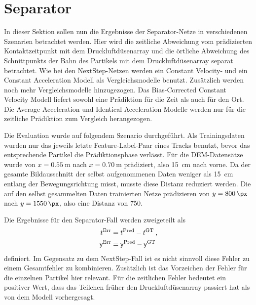 


\section{Separator}





In dieser Sektion sollen nun die Ergebnisse der Separator-Netze in verschiedenen Szenarien betrachtet werden.
Hier wird  die zeitliche Abweichung vom prädizierten Kontaktzeitpunkt mit dem Druckluftdüsenarray und die örtliche Abweichung des Schnittpunkts der Bahn des Partikels mit dem Druckluftdüsenarray separat betrachtet.
Wie bei den NextStep-Netzen werden ein Constant Velocity- und ein Constant Acceleration Modell 
als Vergleichsmodelle benutzt. 
Zusätzlich werden noch mehr Vergleichsmodelle hinzugezogen. 
Das Bias-Corrected Constant Velocity Modell liefert sowohl eine Prädiktion für die Zeit als auch für den Ort.
Die Average Acceleration und Identical Acceleration Modelle werden nur für die zeitliche Prädiktion zum Vergleich herangezogen.

Die Evaluation wurde auf folgendem Szenario durchgeführt.
Als Trainingsdaten wurden nur das jeweils letzte Feature-Label-Paar eines Tracks benutzt, bevor das entsprechende Partikel die Prädiktionsphase verlässt.
Für die DEM-Datensätze wurde von \(x = \SI{0.55}{\meter}\) nach \(x = \SI{0.70}{\meter}\) prädiziert, also \SI{15}{\centi\meter} nach vorne.
Da der gesamte Bildausschnitt der selbst aufgenommenen Daten weniger als \SI{15}{\centi\meter} entlang der Bewegungsrichtung misst, musste diese Distanz reduziert werden.
Die auf den selbst gesammelten Daten trainierten Netze prädizieren von \(y = \SI{800}{\px}\) nach \(y = \SI{1550}{\px}\), also eine Distanz von \SI{750}{\px}.


Die Ergebnisse für den Separator-Fall werden zweigeteilt als
\begin{align*}
    t{^{\text{Err}}} &=  t{^{\text{Pred}}} -  t{^{\text{GT}}} \: ,\\
    \mathsf{y}{^{\text{Err}}} &=  \mathsf{y}{^{\text{Pred}}} -  \mathsf{y}{^{\text{GT}}}
\end{align*}
definiert.
Im Gegensatz zu dem NextStep-Fall ist es nicht sinnvoll diese Fehler zu einem Gesamtfehler zu kombinieren.
Zusätzlich ist das Vorzeichen der Fehler für die einzelnen Partikel hier relevant.
Für die zeitlichen Fehler bedeutet ein positiver Wert, 
dass das Teilchen früher den Druckluftdüsenarray passiert hat als von dem Modell vorhergesagt. 


